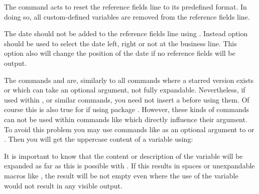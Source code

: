 The command  acts to reset the reference
fields line to its predefined format. In doing so, all custom-defined
variables are removed from the reference fields line.

The date should not be added to the reference fields line
using . Instead option %
%
%
 should be used to select the date left,
right or not at the business line. This option also will change the position
of the date if no reference fields will be output.%
%
\EndIndexGroup


\begin{Declaration}
\end{Declaration}
The commands  and  are, similarly to all
commands where a starred version exists or which can take an optional
argument, not fully expandable. Nevertheless, if used within
,
 or similar commands, you
need not insert a  before using them.  Of
course this is also true for
 if using package
. However, these kinds of
commands can not be used within commands like
which directly influence their argument.  To avoid this problem you may use
commands like  as an optional argument to
 or . Then you will get the uppercase
content of a variable using:
\begin{lstcode}[escapeinside=`']
\end{lstcode}
%
\EndIndexGroup


\begin{Declaration}
\end{Declaration}
It is important to know that the content or description of the variable will
be expanded as far as this is possible with . If this results in
spaces or unexpandable macros like , the result will be not empty
even where the use of the variable would not result in any visible output.
  
